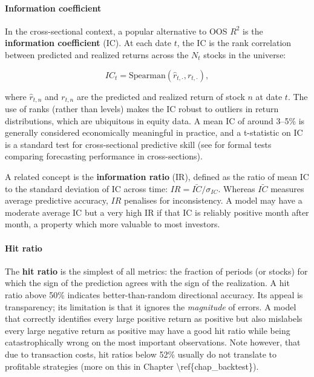 \paragraph{Information coefficient}

In the cross-sectional context, a popular alternative to OOS $R^2$ is the \textbf{information coefficient} (IC). At each date $t$, the IC is the rank correlation between predicted and realized returns across the $N_t$ stocks in the universe:

\begin{equation}
IC_t = \text{Spearman}\left(\hat{r}_{t,\cdot}, r_{t,\cdot}\right),
\end{equation}

where $\hat{r}_{t,n}$ and $r_{t,n}$ are the predicted and realized return of stock $n$ at date $t$. The use of ranks (rather than levels) makes the IC robust to outliers in return distributions, which are ubiquitous in equity data. A mean IC of around 3--5\% is generally considered economically meaningful in practice, and a t-statistic on IC is a standard test for cross-sectional predictive skill (see \cite{qu2023comparing} for formal tests comparing forecasting performance in cross-sections).

A related concept is the \textbf{information ratio} (IR), defined as the ratio of mean IC to the standard deviation of IC across time: $IR = \bar{IC}/\sigma_{IC}$. Whereas $\bar{IC}$ measures average predictive accuracy, $IR$ penalises for inconsistency. A model may have a moderate average IC but a very high IR if that IC is reliably positive month after month, a property which more valuable to most investors.

\paragraph{Hit ratio}

The \textbf{hit ratio} is the simplest of all metrics: the fraction of periods (or stocks) for which the sign of the prediction agrees with the sign of the realization. A hit ratio above 50\% indicates better-than-random directional accuracy. Its appeal is transparency; its limitation is that it ignores the \textit{magnitude} of errors. A model that correctly identifies every large positive return as positive but also mislabels every large negative return as positive may have a good hit ratio while being catastrophically wrong on the most important observations. Note however, that due to transaction costs, hit ratios below 52\% usually do not translate to profitable strategies (more on this in Chapter {\textbackslash}ref\{chap\_backtest\}).

